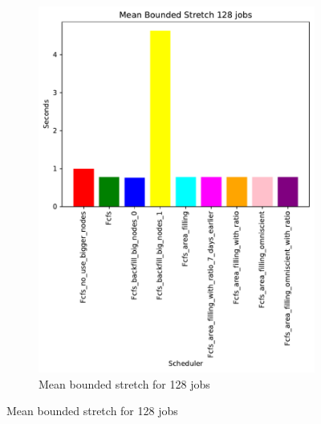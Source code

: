 \documentclass[a4paper]{article}
\begin{document}
\begin{figure}[H]
\begin{subfigure}[b]{0.4\linewidth}\centering\includegraphics[width=0.95\linewidth]{MBSS/plot/Size_Constraint_2022-01-17->2022-01-17_V9532_Mean_Stretch_With_a_Minimum_128_450_128_32_256_4_1024.pdf}\caption{Mean bounded stretch for 128 jobs}\label{45}\end{subfigure}

\end{figure}
\end{document}

